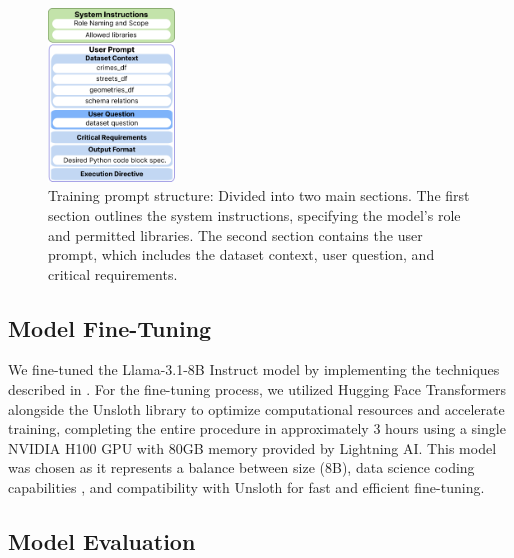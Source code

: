 \begin{figure}[H]
  \centering
  \includegraphics[width=0.3\textwidth]{images/prompt.png}
  \captionsetup{justification=raggedright,singlelinecheck=false}
  \caption{Training prompt structure: Divided into two main sections. The first section outlines the system instructions, specifying the model's role and permitted libraries. The second section contains the user prompt, which includes the dataset context, user question, and critical requirements.}
  \label{fig:training_prompt_structure}
\end{figure}


\subsection{Model Fine-Tuning}

We fine-tuned the Llama-3.1-8B Instruct model \citep{Grattafiori2024Llama3, Unsloth2024WhatModel} by implementing the techniques described in \cite{Pareja2024RecipesSFT}. For the fine-tuning process, we utilized Hugging Face Transformers alongside the Unsloth library to optimize computational resources and accelerate training, completing the entire procedure in approximately 3 hours using a single NVIDIA H100 GPU with 80GB memory provided by Lightning AI. This model was chosen as it represents a balance between size (8B), data science coding capabilities \citep{Lai2022DS1000}, and compatibility with Unsloth for fast and efficient fine-tuning.



\subsection{Model Evaluation}

